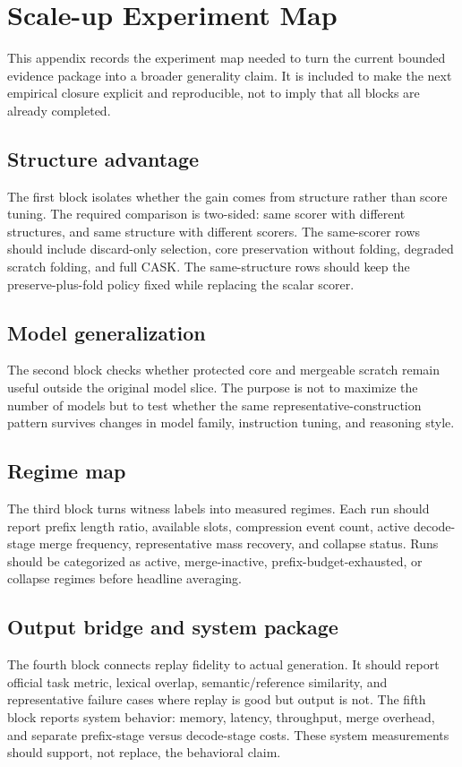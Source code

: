 \section{Scale-up Experiment Map}


This appendix records the experiment map needed to turn the current bounded evidence package into a broader generality claim. It is included to make the next empirical closure explicit and reproducible, not to imply that all blocks are already completed.


\subsection{Structure advantage}


The first block isolates whether the gain comes from structure rather than score tuning. The required comparison is two-sided: same scorer with different structures, and same structure with different scorers. The same-scorer rows should include discard-only selection, core preservation without folding, degraded scratch folding, and full CASK. The same-structure rows should keep the preserve-plus-fold policy fixed while replacing the scalar scorer.


\subsection{Model generalization}


The second block checks whether protected core and mergeable scratch remain useful outside the original model slice. The purpose is not to maximize the number of models but to test whether the same representative-construction pattern survives changes in model family, instruction tuning, and reasoning style.


\subsection{Regime map}


The third block turns witness labels into measured regimes. Each run should report prefix length ratio, available slots, compression event count, active decode-stage merge frequency, representative mass recovery, and collapse status. Runs should be categorized as active, merge-inactive, prefix-budget-exhausted, or collapse regimes before headline averaging.


\subsection{Output bridge and system package}


The fourth block connects replay fidelity to actual generation. It should report official task metric, lexical overlap, semantic/reference similarity, and representative failure cases where replay is good but output is not. The fifth block reports system behavior: memory, latency, throughput, merge overhead, and separate prefix-stage versus decode-stage costs. These system measurements should support, not replace, the behavioral claim.

